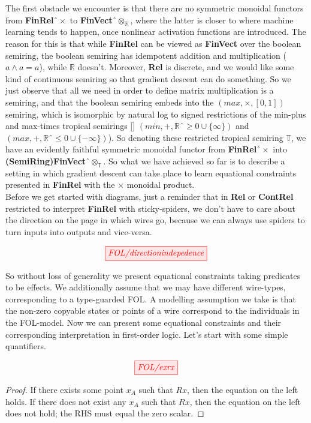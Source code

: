\begin{fullwidth}
The first obstacle we encounter is that there are no symmetric monoidal functors from \textbf{FinRel}$ˆ{\times}$ to \textbf{FinVect}$ˆ{\otimes}_\mathbb{R}$, where the latter is closer to where machine learning tends to happen, once nonlinear activation functions are introduced. The reason for this is that while \textbf{FinRel} can be viewed as \textbf{FinVect} over the boolean semiring, the boolean semiring has idempotent addition and multiplication ($a \wedge a = a$), while $\mathbb{R}$ doesn't. Moreover, \textbf{Rel} is discrete, and we would like some kind of continuous semiring so that gradient descent can do something. So we just observe that all we need in order to define matrix multiplication is a semiring, and that the boolean semiring embeds into the $(max,\times,[0,1])$ semiring, which is isomorphic by natural log to signed restrictions of the min-plus and max-times tropical semirings [] $(min,+,\mathbb{R}ˆ{\geq 0} \cup \{\infty\})$ and $(max,+,\mathbb{R}ˆ{\leq 0} \cup \{- \infty\})$). So denoting these restricted tropical semiring $\mathbb{T}$, we have an evidently faithful symmetric monoidal functor from \textbf{FinRel}$ˆ{\times}$ into \textbf{(SemiRing)FinVect}$ˆ{\otimes}_\mathbb{T}$. So what we have achieved so far is to describe a setting in which gradient descent can take place to learn equational constraints presented in \textbf{FinRel} with the $\times$ monoidal product.\\

Before we get started with diagrams, just a reminder that in \textbf{Rel} or \textbf{ContRel} restricted to interpret \textbf{FinRel} with sticky-spiders, we don't have to care about the direction on the page in which wires go, because we can always use spiders to turn inputs into outputs and vice-versa.

\[\tikzfig{FOL/directionindepedence}\]

So without loss of generality we present equational constraints taking predicates to be effects. We additionally assume that we may have different wire-types, corresponding to a type-guarded FOL. A modelling assumption we take is that the non-zero copyable states or points of a wire correspond to the individuals in the FOL-model. Now we can present some equational constraints and their corresponding interpretation in first-order logic. Let's start with some simple quantifiers.

\begin{proposition}
\[\tikzfig{FOL/exrx}\]
\begin{proof}
If there exists some point $x_A$ such that $Rx$, then the equation on the left holds. If there does not exist any $x_A$ such that $Rx$, then the equation on the left does not hold; the RHS must equal the zero scalar.
\end{proof}
\end{proposition}


\end{fullwidth}
